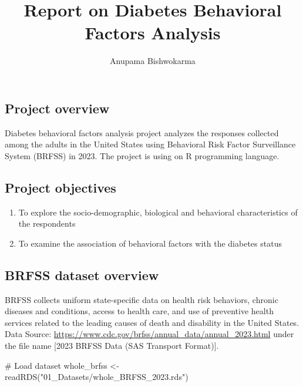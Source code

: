 \documentclass[
  letterpaper,
  DIV=11,
  numbers=noendperiod]{scrartcl}
\title{Report on Diabetes Behavioral Factors Analysis}
\author{Anupama Bishwokarma}
\date{}
\newenvironment{Shaded}{\begin{snugshade}}{\end{snugshade}}
\newcommand{\CommentTok}[1]{\textcolor[rgb]{0.37,0.37,0.37}{#1}}
\newcommand{\FunctionTok}[1]{\textcolor[rgb]{0.28,0.35,0.67}{#1}}
\newcommand{\NormalTok}[1]{\textcolor[rgb]{0.00,0.23,0.31}{#1}}
\newcommand{\OtherTok}[1]{\textcolor[rgb]{0.00,0.23,0.31}{#1}}
\newcommand{\StringTok}[1]{\textcolor[rgb]{0.13,0.47,0.30}{#1}}
\providecommand{\tightlist}{%
  \setlength{\itemsep}{0pt}\setlength{\parskip}{0pt}}\usepackage{longtable,booktabs,array}
\begin{document}
\maketitle


\subsection{Project overview}\label{project-overview}

Diabetes behavioral factors analysis project analyzes the responses
collected among the adults in the United States using Behavioral Risk
Factor Surveillance System (BRFSS) in 2023. The project is using on R
programming language.

\subsection{Project objectives}\label{project-objectives}

\begin{enumerate}
\def\labelenumi{\arabic{enumi}.}
\tightlist
\item
  To explore the socio-demographic, biological and behavioral
  characteristics of the respondents
\item
  To examine the association of behavioral factors with the diabetes
  status
\end{enumerate}

\subsection{BRFSS dataset overview}\label{brfss-dataset-overview}

BRFSS collects uniform state-specific data on health risk behaviors,
chronic diseases and conditions, access to health care, and use of
preventive health services related to the leading causes of death and
disability in the United States. Data Source:
\url{https://www.cdc.gov/brfss/annual_data/annual_2023.html} under the
file name {[}2023 BRFSS Data (SAS Transport Format){]}.

\begin{Shaded}
\begin{Highlighting}[]
\CommentTok{\# Load dataset}
\NormalTok{whole\_brfss }\OtherTok{\textless{}{-}} \FunctionTok{readRDS}\NormalTok{(}\StringTok{"01\_Datasets/whole\_BRFSS\_2023.rds"}\NormalTok{)}
\end{Highlighting}
\end{Shaded}
\end{document}
